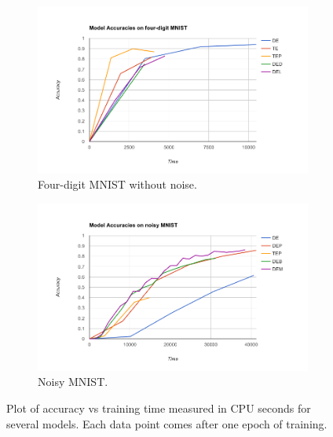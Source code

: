 
\begin{figure}
    \centering
    \begin{subfigure}[c]{1.0\textwidth}
        \centering    \includegraphics[scale=0.5]{resources/mnist_4_graph.png}
        \caption{Four-digit MNIST without noise.}
        \label{fig:mnist_early_models}
    \end{subfigure}
    \begin{subfigure}[c]{1.0\textwidth}
        \centering
        \includegraphics[scale=0.5]{resources/model_experiments.png}
        \caption{Noisy MNIST.}
        \label{fig:mnist_models}
    \end{subfigure}
    \caption{Plot of accuracy vs training time measured in CPU seconds for several models. Each data point comes after one epoch of training.}
\end{figure}